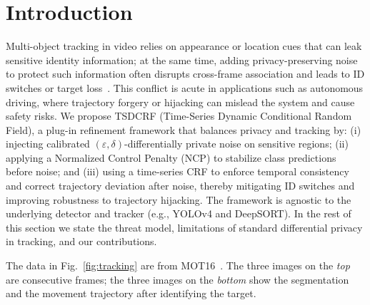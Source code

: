 \documentclass[trans]{IEEEtran}
\begin{document}
%



\section{Introduction}
%
%
%
%

Multi-object tracking in video relies on appearance or location cues that can leak sensitive identity information; at the same time, adding privacy-preserving noise to protect such information often disrupts cross-frame association and leads to ID switches or target loss~\cite{guo2021topology}. This conflict is acute in applications such as autonomous driving, where trajectory forgery or hijacking can mislead the system and cause safety risks. We propose TSDCRF (Time-Series Dynamic Conditional Random Field), a plug-in refinement framework that balances privacy and tracking by: (i) injecting calibrated $(\varepsilon,\delta)$-differentially private noise on sensitive regions; (ii) applying a Normalized Control Penalty (NCP) to stabilize class predictions before noise; and (iii) using a time-series CRF to enforce temporal consistency and correct trajectory deviation after noise, thereby mitigating ID switches and improving robustness to trajectory hijacking. The framework is agnostic to the underlying detector and tracker (e.g., YOLOv4 and DeepSORT). In the rest of this section we state the threat model, limitations of standard differential privacy in tracking, and our contributions.

The data in Fig.~\ref{fig:tracking} are from MOT16~\cite{milan2016mot16}. The three images on the \emph{top} are consecutive frames; the three images on the \emph{bottom} show the segmentation and the movement trajectory after identifying the target. 
\end{document}
